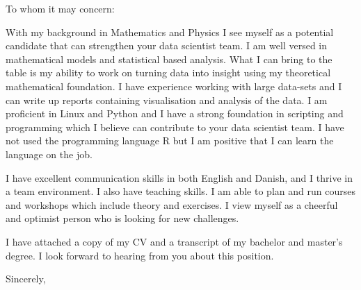\documentclass[10pt,a4paper]{letter}
\begin{document}
\begin{letter}{}
\opening{To whom it may concern:}

With my background in Mathematics and Physics I see myself as a potential candidate that can strengthen your data scientist team. I am well versed in mathematical models and statistical based analysis. What I can bring to the table is my ability to work on turning data into insight using my theoretical mathematical foundation. I have experience working with large data-sets and I can write up reports containing visualisation and analysis of the data. I am proficient in Linux and Python and I have a strong foundation in scripting and programming which I believe can contribute to your data scientist team. I have not used the programming language R but I am positive that I can learn the language on the job.
 
I have excellent communication skills in both English and Danish, and I thrive in a team environment. I also have teaching skills. I am able to plan and run courses and workshops which include theory and exercises. I view myself as a cheerful and optimist person who is looking for new challenges.

I have attached a copy of my CV and a transcript of my bachelor and master's degree. I look forward to hearing from you about this position.   

\closing{Sincerely,}

\end{letter}

\end{document}
